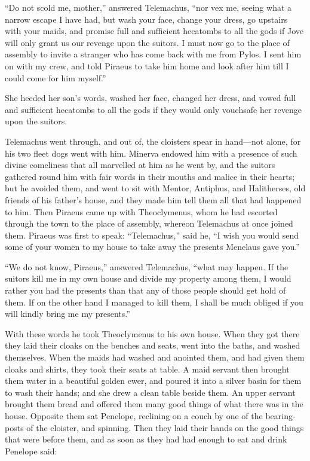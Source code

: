 “Do not scold me, mother,” answered Telemachus, “nor vex me, seeing what a
narrow escape I have had, but wash your face, change your dress, go upstairs
with your maids, and promise full and sufficient hecatombs to all the gods if
Jove will only grant us our revenge upon the suitors. I must now go to the
place of assembly to invite a stranger who has come back with me from Pylos. I
sent him on with my crew, and told Piraeus to take him home and look after him
till I could come for him myself.”

She heeded her son’s words, washed her face, changed her dress, and vowed full
and sufficient hecatombs to all the gods if they would only vouchsafe her
revenge upon the suitors.

Telemachus went through, and out of, the cloisters spear in hand—not alone, for
his two fleet dogs went with him. Minerva endowed him with a presence of such
divine comeliness that all marvelled at him as he went by, and the suitors
gathered round him with fair words in their mouths and malice in their hearts;
but he avoided them, and went to sit with Mentor, Antiphus, and Halitherses,
old friends of his father’s house, and they made him tell them all that had
happened to him. Then Piraeus came up with Theoclymenus, whom he had escorted
through the town to the place of assembly, whereon Telemachus at once joined
them. Piraeus was first to speak: “Telemachus,” said he, “I wish you would send
some of your women to my house to take away the presents Menelaus gave you.”

“We do not know, Piraeus,” answered Telemachus, “what may happen. If the
suitors kill me in my own house and divide my property among them, I would
rather you had the presents than that any of those people should get hold of
them. If on the other hand I managed to kill them, I shall be much obliged if
you will kindly bring me my presents.”

With these words he took Theoclymenus to his own house. When they got there
they laid their cloaks on the benches and seats, went into the baths, and
washed themselves. When the maids had washed and anointed them, and had given
them cloaks and shirts, they took their seats at table. A maid servant then
brought them water in a beautiful golden ewer, and poured it into a silver
basin for them to wash their hands; and she drew a clean table beside them. An
upper servant brought them bread and offered them many good things of what
there was in the house. Opposite them sat Penelope, reclining on a couch by one
of the bearing-posts of the cloister, and spinning. Then they laid their hands
on the good things that were before them, and as soon as they had had enough to
eat and drink Penelope said:

